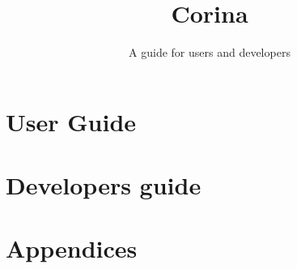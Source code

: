 \documentclass[10pt,letter, twopage headsepline]{manual}
\title{Corina}
\subtitle{A guide for users and developers}
\begin{document}
  
  

  \part{User Guide}
    
    
    
    
    
    
    
    
    
    
    

  \part{Developers guide}
    
    
    

  \part{Appendices}
    \appendix
    
    

    \cleardoublepage
    
    

    \cleardoublepage
    \printindex

    
\end{document}
